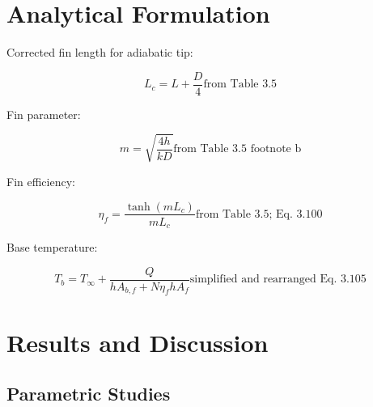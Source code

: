 \documentclass[12pt]{article}
\begin{document}
\section{Analytical Formulation}

Corrected fin length for adiabatic tip:

\begin{equation}
L_c = L + \frac{D}{4}  \text{from Table 3.5}
\end{equation}

Fin parameter:

\begin{equation}
m = \sqrt{\frac{4h}{kD}}  \text{from Table 3.5 footnote b}
\end{equation}

Fin efficiency:

\begin{equation}
\eta_f = \frac{\tanh(m L_c)}{m L_c} \text{from Table 3.5; Eq. 3.100}
\end{equation}

Base temperature:

\begin{equation}
T_b = T_\infty + \frac{Q}{h A_{b,f} + N \eta_f h A_f} \text{simplified and rearranged Eq. 3.105}
\end{equation}

\section{Results and Discussion}

\subsection{Parametric Studies}
\end{document}
